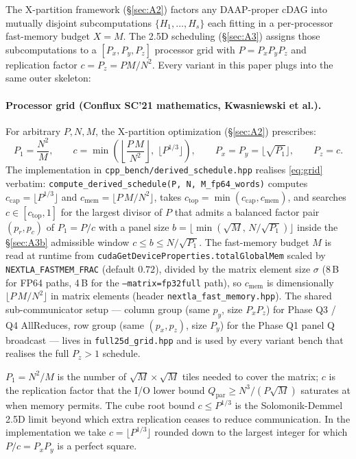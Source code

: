 \documentclass[11pt]{article}
\begin{document}
The X-partition framework (\S\ref{sec:A2}) factors any DAAP-proper
cDAG into mutually disjoint subcomputations $\{H_1, \dots, H_s\}$ each
fitting in a per-processor fast-memory budget $X = M$. The 2.5D
scheduling (\S\ref{sec:A3}) assigns those subcomputations to a
$[P_x, P_y, P_z]$ processor grid with $P = P_x P_y P_z$ and replication
factor $c = P_z = P M / N^2$. Every variant in this paper plugs into
the same outer skeleton:

\paragraph{Processor grid (Conflux SC'21 mathematics, Kwasniewski et al.).}
For arbitrary $P, N, M$, the X-partition optimization (\S\ref{sec:A2}) prescribes:
\begin{equation}
P_1 = \frac{N^2}{M},\qquad
c   = \min\!\left(\left\lfloor\frac{P\,M}{N^2}\right\rfloor,\; \lfloor P^{1/3}\rfloor\right),\qquad
P_x = P_y = \lfloor\sqrt{P_1}\rfloor,\qquad P_z = c.
\label{eq:grid}
\end{equation}
The implementation in \texttt{cpp\_bench/derived\_schedule.hpp} realises
\eqref{eq:grid} verbatim:
\verb|compute_derived_schedule(P, N, M_fp64_words)| computes
$c_{\mathrm{cap}} = \lfloor P^{1/3}\rfloor$ and
$c_{\mathrm{mem}} = \lfloor P\,M / N^2\rfloor$, takes
$c_{\mathrm{top}} = \min(c_{\mathrm{cap}}, c_{\mathrm{mem}})$, and searches
$c \in [c_{\mathrm{top}}, 1]$ for the largest divisor of $P$ that admits a
balanced factor pair $(p_r, p_c)$ of $P_1 = P/c$ with a panel size
$b = \lfloor\min(\sqrt{M},\, N/\sqrt{P_1})\rfloor$ inside the
\S\ref{sec:A3b} admissible window $c \le b \le N/\sqrt{P_1}$.
The fast-memory budget $M$ is read at runtime from
\texttt{cudaGetDeviceProperties.totalGlobalMem} scaled by
\texttt{NEXTLA\_FASTMEM\_FRAC} (default $0.72$), divided by the matrix
element size $\sigma$ (8\,B for FP64 paths, 4\,B for the
\texttt{--matrix=fp32full} path), so $c_{\mathrm{mem}}$ is dimensionally
$\lfloor P\,M / N^2\rfloor$ in matrix elements (header
\texttt{nextla\_fast\_memory.hpp}).
The shared sub-communicator setup --- column group (same $p_y$, size
$P_x P_z$) for Phase Q3 / Q4 AllReduces, row group (same $(p_x, p_z)$,
size $P_y$) for the Phase Q1 panel Q broadcast --- lives in
\texttt{full25d\_grid.hpp} and is used by every variant bench that
realises the full $P_z>1$ schedule.

$P_1 = N^2/M$ is the number of $\sqrt{M}\!\times\!\sqrt{M}$ tiles needed to
cover the matrix; $c$ is the replication factor that the I/O lower bound
$Q_{\text{par}} \ge N^3/(P\sqrt{M})$ saturates at when memory permits. The
cube root bound $c \le P^{1/3}$ is the Solomonik-Demmel 2.5D limit beyond
which extra replication ceases to reduce communication. In the implementation we
take $c = \lfloor P^{1/3} \rfloor$ rounded down to the largest integer for
which $P/c = P_x P_y$ is a perfect square.
\end{document}
